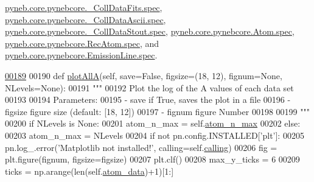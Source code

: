 \hyperlink{pynebcore_8py_source_l00578}{pyneb.\-core.\-pynebcore.\-\_\-\-Coll\-Data\-Fits.\-spec}, \hyperlink{pynebcore_8py_source_l00928}{pyneb.\-core.\-pynebcore.\-\_\-\-Coll\-Data\-Ascii.\-spec}, \hyperlink{pynebcore_8py_source_l01164}{pyneb.\-core.\-pynebcore.\-\_\-\-Coll\-Data\-Stout.\-spec}, \hyperlink{pynebcore_8py_source_l01220}{pyneb.\-core.\-pynebcore.\-Atom.\-spec}, \hyperlink{pynebcore_8py_source_l02637}{pyneb.\-core.\-pynebcore.\-Rec\-Atom.\-spec}, and \hyperlink{pynebcore_8py_source_l03390}{pyneb.\-core.\-pynebcore.\-Emission\-Line.\-spec}.


\begin{DoxyCode}
\hypertarget{classpyneb_1_1plot_1_1plot_atomic_data_1_1_data_plot_l00189}{}\hyperlink{classpyneb_1_1plot_1_1plot_atomic_data_1_1_data_plot_a0b245c7f8b97681b15beadcef38a0021}{00189} 
00190     \textcolor{keyword}{def }\hyperlink{classpyneb_1_1plot_1_1plot_atomic_data_1_1_data_plot_a0b245c7f8b97681b15beadcef38a0021}{plotAllA}(self, save=False, figsize=(18, 12), fignum=\textcolor{keywordtype}{None}, NLevels=\textcolor{keywordtype}{None}):
00191         \textcolor{stringliteral}{"""}
00192 \textcolor{stringliteral}{        Plot the log of the A values of each data set }
00193 \textcolor{stringliteral}{        }
00194 \textcolor{stringliteral}{        Parameters:}
00195 \textcolor{stringliteral}{            - save     if True, saves the plot in a file}
00196 \textcolor{stringliteral}{            - figsize  figure size (default: [18, 12])}
00197 \textcolor{stringliteral}{            - fignum    figure Number}
00198 \textcolor{stringliteral}{}
00199 \textcolor{stringliteral}{        """}
00200         \textcolor{keywordflow}{if} NLevels \textcolor{keywordflow}{is} \textcolor{keywordtype}{None}:
00201             atom\_n\_max = self.\hyperlink{classpyneb_1_1plot_1_1plot_atomic_data_1_1_data_plot_a668572cfe9a684e7195535d60d343938}{atom\_n\_max}
00202         \textcolor{keywordflow}{else}:
00203             atom\_n\_max = NLevels
00204         \textcolor{keywordflow}{if} \textcolor{keywordflow}{not} pn.config.INSTALLED[\textcolor{stringliteral}{'plt'}]:
00205             pn.log\_.error(\textcolor{stringliteral}{'Matplotlib not installed!'}, calling=self.\hyperlink{classpyneb_1_1plot_1_1plot_atomic_data_1_1_data_plot_a393a133b607541c57d5ebc5a34687e3f}{calling})
00206         fig = plt.figure(fignum, figsize=figsize)
00207         plt.clf()
00208         max\_y\_ticks = 6
00209         ticks = np.arange(len(self.\hyperlink{classpyneb_1_1plot_1_1plot_atomic_data_1_1_data_plot_aee33ad460a38cb4293a5bd89cec12294}{atom\_data})+1)[1:] 

\end{DoxyCode}
